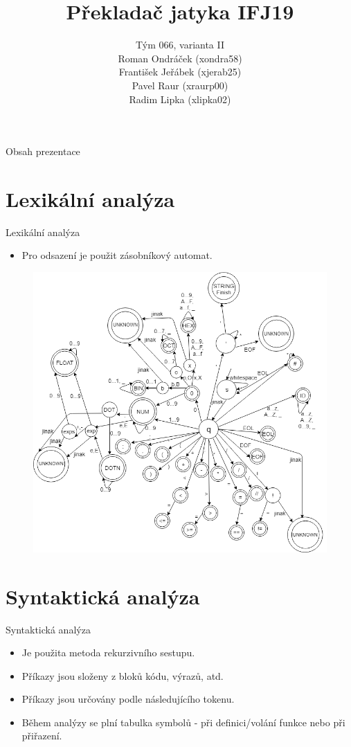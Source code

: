 \documentclass[12pt]{beamer}
\author[Tým 066, varianta II]{{\Large Tým 066, varianta II\\}Roman Ondráček (xondra58)\\František Jeřábek (xjerab25)\\Pavel Raur (xraurp00)\\ Radim Lipka (xlipka02)}
\title{Překladač jatyka IFJ19}
\begin{document}
\begin{frame}
\titlepage
\end{frame}

\begin{frame}{Obsah prezentace}
\tableofcontents
\end{frame}

\section{Lexikální analýza}
\begin{frame}{Lexikální analýza}
\begin{itemize}
\item Pro odsazení je použit zásobníkový automat.
\end{itemize}
\endminipage
{}
\begin{figure}[!htbp]
    \centering
    \includegraphics[width = \textwidth]{img/Lexical_Analysis.png}
\end{figure}
 \endminipage
\end{frame}

\section{Syntaktická analýza}
\begin{frame}{Syntaktická analýza}
\begin{itemize}
\item Je použita metoda rekurzivního sestupu.
\item Příkazy jsou složeny z bloků kódu, výrazů, atd.
\item Příkazy jsou určovány podle následujícího tokenu.
\item Během analýzy se plní tabulka symbolů - při definici/volání funkce nebo při přiřazení.
\end{itemize}
\end{frame}
\end{document}
